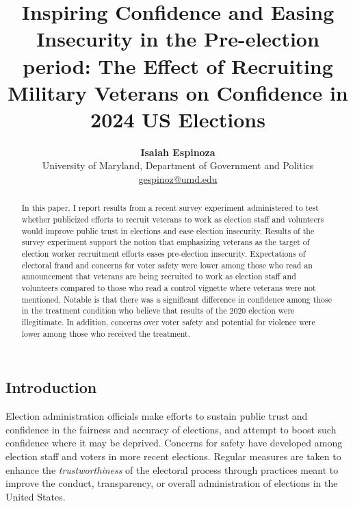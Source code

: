\documentclass[
  12pt,
  letterpaper,
]{article}
\title{Inspiring Confidence and Easing Insecurity in the Pre-election
period: The Effect of Recruiting Military Veterans on Confidence in 2024
US Elections}
\author{
{\bfseries \normalsize Isaiah Espinoza}%
 \\%
 \small University of Maryland, Department of Government and
Politics \\%
{\footnotesize \url{gespinoz@umd.edu}} \\\vspace{10pt}
}
\date{}
\begin{document}
\renewcommand{\abstractname}{Abstract.}


\maketitle
\begin{abstract}
In this paper, I report results from a recent survey experiment
administered to test whether publicized efforts to recruit veterans to
work as election staff and volunteers would improve public trust in
elections and ease election insecurity. Results of the survey experiment
support the notion that emphasizing veterans as the target of election
worker recruitment efforts eases pre-election insecurity. Expectations
of electoral fraud and concerns for voter safety were lower among those
who read an announcement that veterans are being recruited to work as
election staff and volunteers compared to those who read a control
vignette where veterans were not mentioned. Notable is that there was a
significant difference in confidence among those in the treatment
condition who believe that results of the 2020 election were
illegitimate. In addition, concerns over voter safety and potential for
violence were lower among those who received the treatment.
\end{abstract}


\newpage{}

\subsection{Introduction}\label{introduction}

Election administration officials make efforts to sustain public trust
and confidence in the fairness and accuracy of elections, and attempt to
boost such confidence where it may be deprived. Concerns for safety have
developed among election staff and voters in more recent elections.
Regular measures are taken to enhance the \emph{trustworthiness} of the
electoral process through practices meant to improve the conduct,
transparency, or overall administration of elections in the United
States.
\end{document}
